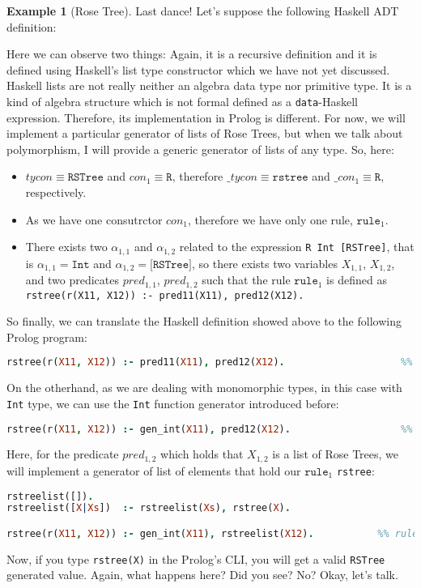 \documentclass{report}
\theoremstyle{definition}
\newtheorem{example}{Example}[section]
\theoremstyle{definition}
\newcommand{\ttt}[1]{\texttt{#1}}
\begin{document}
\begin{example}[Rose Tree]
	Last dance! Let's suppose the following Haskell ADT definition:
	
	Here we can observe two things: Again, it is a recursive definition and it is defined using Haskell's list type constructor which we have not yet discussed. \\
	
	Haskell lists are not really neither an algebra data type nor primitive type. It is a kind of algebra structure which is not formal defined as a \ttt{data}-Haskell expression. Therefore, its implementation in Prolog is different. For now, we will implement a particular generator of lists of Rose Trees, but when we talk about polymorphism, I will provide a generic generator of lists of any type. So, here:
	\begin{itemize}
		\item $tycon \equiv \ttt{RSTree}$ and $con_1 \equiv \ttt{R}$, therefore $\_tycon \equiv \ttt{rstree}$ and $\_con_1 \equiv \ttt{R}$, respectively.
		\item As we have one consutrctor $con_1$, therefore we have only one rule, $\ttt{rule}_1$.
		\item There exists two $\alpha_{1,1}$ and $\alpha_{1,2}$ related to the expression \ttt{R Int [RSTree]}, that is $\alpha_{1,1} = \ttt{Int}$ and $\alpha_{1,2} = \ttt{[RSTree]}$, so there exists two variables $X_{1,1}$, $X_{1,2}$, and two predicates $pred_{1,1}$, $pred_{1,2}$ such that the rule $\ttt{rule}_1$ is defined as \\ \ttt{rstree(r(X11, X12)) :- pred11(X11), pred12(X12).}
	\end{itemize}
	So finally, we can translate the Haskell definition showed above to the following Prolog program:\\
\begin{lstlisting}[language=Prolog]
rstree(r(X11, X12)) :- pred11(X11), pred12(X12).					%% rule 1
\end{lstlisting}
On the otherhand, as we are dealing with monomorphic types, in this case with \ttt{Int} type, we can use the \ttt{Int} function generator introduced before:\\
\begin{lstlisting}[language=Prolog]
rstree(r(X11, X12)) :- gen_int(X11), pred12(X12).					%% rule 1
\end{lstlisting}
Here, for the predicate $pred_{1,2}$ which holds that $X_{1,2}$ is a list of Rose Trees, we will implement a generator of list of elements that hold our $\ttt{rule}_1$ \ttt{rstree}:
\begin{lstlisting}[language=Prolog]
rstreelist([]).
rstreelist([X|Xs]) 	:- rstreelist(Xs), rstree(X).

rstree(r(X11, X12)) :- gen_int(X11), rstreelist(X12).			%% rule 1
\end{lstlisting}
Now, if you type \ttt{rstree(X)} in the Prolog's CLI, you will get a valid \ttt{RSTree} generated value. Again, what happens here? Did you see? No? Okay, let's talk.
\end{example}
\end{document}
